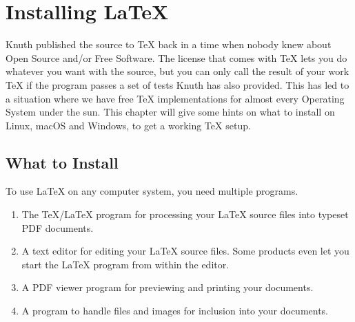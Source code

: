 %
%
%
%


\chapter{Installing \LaTeX}\label{installinglatex}
\begin{intro}
  Knuth published the source to \TeX{} back in a time when nobody knew
  about Open Source and/or Free Software. The license that comes with \TeX{}
  lets you do whatever you want with the source, but you can only call the
  result of your work \TeX{} if the program passes a set of tests Knuth has
  also provided. This has led to a situation where we have free \TeX{}
  implementations for almost every Operating System under the sun. This chapter
  will give some hints on what to install on Linux, macOS and Windows, to
  get a working \TeX{} setup.
\end{intro}

\section{What to Install}

To use \LaTeX{} on any computer system, you need multiple programs.

\begin{enumerate}

  \item The \TeX{}/\LaTeX{} program for processing your \LaTeX{} source files
        into typeset PDF documents.

  \item A text editor for editing your \LaTeX{} source files. Some products even let
        you start the \LaTeX{} program from within the editor.

  \item A PDF viewer program for previewing and printing your
        documents.

  \item A program to handle \PSi{} files and images for inclusion into
        your documents.

\end{enumerate}

